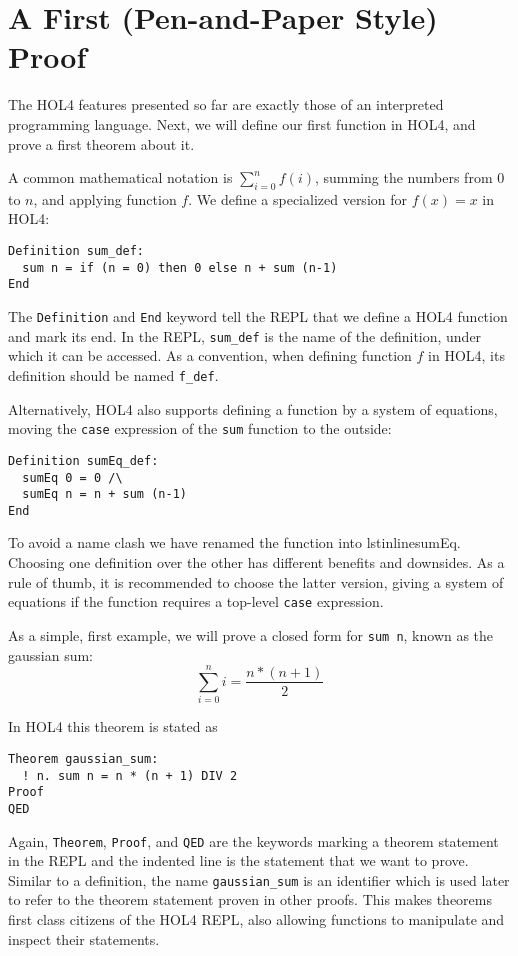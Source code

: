 \documentclass[10pt]{scrartcl}
\begin{document}
\section{A First (Pen-and-Paper Style) Proof}
%
The HOL4 features presented so far are exactly those of an interpreted
programming language.
Next, we will define our first function in HOL4, and prove a first theorem about
it.

A common mathematical notation is $\sum_{i=0}^n f (i)$,
summing the numbers from $0$ to $n$, and applying function $f$.
We define a specialized version for $f (x) = x$ in HOL4:

\begin{lstlisting}
Definition sum_def:
  sum n = if (n = 0) then 0 else n + sum (n-1)
End
\end{lstlisting}

The \lstinline{Definition} and \lstinline{End} keyword tell the REPL that we
define a HOL4 function and mark its end.
In the REPL, \lstinline{sum_def} is the name of the definition, under which it
can be accessed.
As a convention, when defining function $f$ in HOL4, its definition should be
named \lstinline{f_def}.

Alternatively, HOL4 also supports defining a function by a system of equations,
moving the \texttt{case} expression of the \lstinline{sum} function to the
outside:
\begin{lstlisting}
Definition sumEq_def:
  sumEq 0 = 0 /\
  sumEq n = n + sum (n-1)
End
\end{lstlisting}

To avoid a name clash we have renamed the function into lstinline{sumEq}.
Choosing one definition over the other has different benefits and downsides.
As a rule of thumb, it is recommended to choose the latter version, giving a
system of equations if the function requires a top-level \texttt{case}
expression.

As a simple, first example, we will prove a closed form for \lstinline{sum n},
known as the gaussian sum:
\[
  \sum_{i=0}^{n} i = \frac{n * (n + 1)}{2}
\]

In HOL4 this theorem is stated as

\begin{lstlisting}
Theorem gaussian_sum:
  ! n. sum n = n * (n + 1) DIV 2
Proof
QED
\end{lstlisting}

Again, \lstinline{Theorem}, \lstinline{Proof}, and \lstinline{QED} are the
keywords marking a theorem statement in the REPL and the indented line is
the statement that we want to prove.
Similar to a definition, the name \lstinline{gaussian_sum} is an identifier
which is used later to refer to the theorem statement proven in other proofs.
This makes theorems first class citizens of the HOL4 REPL, also allowing
functions to manipulate and inspect their statements.
\end{document}
